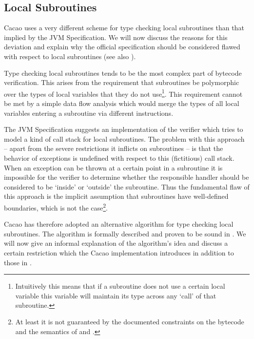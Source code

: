 \subsection{Local Subroutines}

Cacao uses a very different scheme for type checking local subroutines
than that implied by the JVM Specification. We will now discuss the
reasons for this deviation and explain why the official specification
should be considered flawed with respect to local subroutines (see
also \cite{Coglio01}).

Type checking local subroutines tends to be the most complex part of
bytecode verification. This arises from the requirement \cite{javavm99}
that subroutines be polymorphic over the types of local variables that
they do not use\footnote{Intuitively this means that if a subroutine
does not use a certain local variable this variable will maintain its
type across any  `call' of that subroutine.}. This
requirement cannot be met by a simple data flow analysis which would
merge the types of all local variables entering a subroutine via
different  instructions.

The JVM Specification suggests an implementation of the verifier which
tries to model a kind of call stack for local subroutines. The problem
with this approach -- apart from the severe restrictions it inflicts
on subroutines -- is that the behavior of exceptions is undefined with
respect to this (fictitious) call stack. When an exception can be
thrown at a certain point in a subroutine it is impossible for the
verifier to determine whether the responsible handler should be
considered to be `inside' or `outside' the subroutine. Thus the
fundamental flaw of this approach is the implicit assumption that
subroutines have well-defined boundaries, which is not the
case\footnote{At least it is not guaranteed by the documented
constraints on the bytecode and the semantics of  and
.}.

Cacao has therefore adopted an alternative algorithm for type checking
local subroutines. The algorithm is formally described and proven to
be sound in \cite{Coglio02}. We will now give an informal explanation
of the algorithm's idea and discuss a certain restriction which the
Cacao implementation introduces in addition to those in
\cite{Coglio02}.

